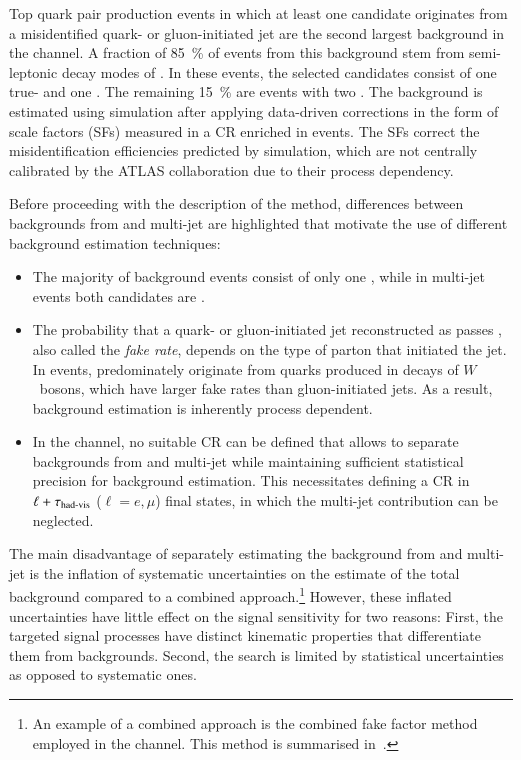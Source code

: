 Top quark pair production events in which at least one \tauhadvis candidate
originates from a misidentified quark- or gluon-initiated jet are the second
largest background in the \hadhad channel. A fraction of \SI{85}{\percent} of
events from this background stem from semi-leptonic decay modes of \ttbar. In
these events, the selected \tauhadvis candidates consist of one true- and one
\faketauhadvis. The remaining \SI{15}{\percent} are \ttbarFakes events with two
\faketauhadvis.
The \ttbarFakes background is estimated using simulation after applying
data-driven corrections in the form of \faketauhadvis scale factors (SFs)
measured in a CR enriched in \ttbar events. The SFs correct the \jettotauhadvis
misidentification efficiencies predicted by simulation, which are not centrally
calibrated by the ATLAS collaboration due to their process dependency.

Before proceeding with the description of the method, differences between
\faketauhadvis backgrounds from \ttbar and multi-jet are highlighted that
motivate the use of different background estimation techniques:
\begin{itemize}

\item The majority of \ttbarFakes background events consist of only one
  \faketauhadvis, while in multi-jet events both candidates are \faketauhadvis.

\item The probability that a quark- or gluon-initiated jet reconstructed as
  \tauhadvis passes \tauid, also called the \emph{fake rate}, depends on the
  type of parton that initiated the jet. In \ttbar events, \faketauhadvis
  predominately originate from quarks produced in decays of $W$~bosons, which
  have larger fake rates than gluon-initiated jets. As a result, \faketauhadvis
  background estimation is inherently process dependent.

\item In the \hadhad channel, no suitable \ttbarFakes CR can be defined that
  allows to separate \faketauhadvis backgrounds from \ttbar and multi-jet while
  maintaining sufficient statistical precision for background estimation. This
  necessitates defining a CR in $\ell + \tau_{\text{had-vis}}$ ($\ell = e, \mu$) final
  states, in which the multi-jet contribution can be neglected.

\end{itemize}
The main disadvantage of separately estimating the \faketauhadvis background
from \ttbar and multi-jet is the inflation of systematic uncertainties on the
estimate of the total \faketauhadvis background compared to a combined
approach.\footnote{An example of a combined approach is the combined fake factor
  method employed in the \lephad channel. This method is summarised
  in~.}  However, these inflated uncertainties
have little effect on the signal sensitivity for two reasons: First, the
targeted signal processes have distinct kinematic properties that differentiate
them from \faketauhadvis backgrounds. Second, the search is limited by
statistical uncertainties as opposed to systematic ones.


